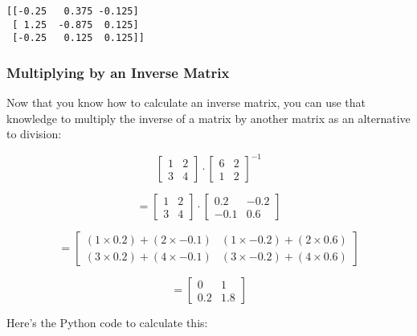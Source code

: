 \documentclass[11pt]{article}
\begin{document}
    \begin{Verbatim}[commandchars=\\\{\}]
[[-0.25   0.375 -0.125]
 [ 1.25  -0.875  0.125]
 [-0.25   0.125  0.125]]

    \end{Verbatim}

    \hypertarget{multiplying-by-an-inverse-matrix}{%
\subsubsection{Multiplying by an Inverse
Matrix}\label{multiplying-by-an-inverse-matrix}}

Now that you know how to calculate an inverse matrix, you can use that
knowledge to multiply the inverse of a matrix by another matrix as an
alternative to division:

\begin{equation}\begin{bmatrix}1 & 2\\3 & 4\end{bmatrix} \cdot \begin{bmatrix}6 & 2\\1 & 2\end{bmatrix}^{-1} \end{equation}

\begin{equation}=\begin{bmatrix}1 & 2\\3 & 4\end{bmatrix} \cdot \begin{bmatrix}0.2 & -0.2\\-0.1 & 0.6\end{bmatrix}  \end{equation}

\begin{equation}=\begin{bmatrix}(1\times0.2)+(2\times-0.1) & (1\times-0.2)+(2\times0.6)\\(3\times0.2)+(4\times-0.1) & (3\times-0.2)+(4\times0.6)\end{bmatrix}\end{equation}

\begin{equation}=\begin{bmatrix}0 & 1\\0.2 & 1.8\end{bmatrix}\end{equation}

Here's the Python code to calculate this:
\end{document}
